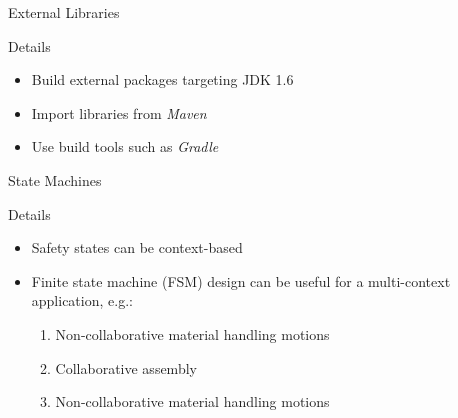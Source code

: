\documentclass{beamer}
\begin{document}
\begin{frame}{External Libraries}

  \begin{block}{Details}
    \begin{itemize}
      \item Build external packages targeting JDK 1.6
      \item Import libraries from \textit{Maven}
      \item Use build tools such as \textit{Gradle}
    \end{itemize}
  \end{block}
\end{frame}

\begin{frame}{State Machines}

  \begin{block}{Details}
    \begin{itemize}
      \item Safety states can be context-based
      \item Finite state machine (FSM) design can be useful for a multi-context application, e.g.:
      \begin{enumerate}
        \item Non-collaborative material handling motions
        \item Collaborative assembly
        \item Non-collaborative material handling motions
      \end{enumerate}
    \end{itemize}
  \end{block}
\end{frame}
\end{document}
